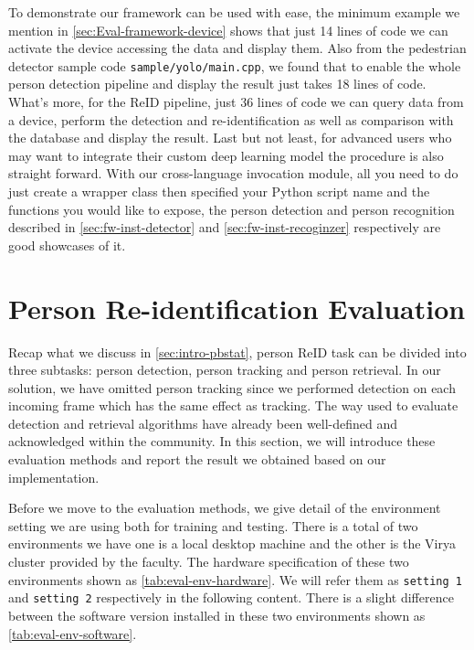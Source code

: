 To demonstrate our framework can be used with ease, the minimum example we
mention in \autoref{sec:Eval-framework-device} shows that just 14 lines of code
we can activate the device accessing the data and display them. Also from the
pedestrian detector sample code \texttt{sample/yolo/main.cpp}, we found
that to enable the whole person detection pipeline and display the result just
takes 18 lines of code. What's more, for the ReID pipeline, just 36 lines of
code we can query data from a device, perform the detection and re-identification
as well as comparison with the database and display the result. Last but not
least, for advanced users who may want to integrate their custom deep learning
model the procedure is also straight forward. With our cross-language invocation
module, all you need to do just create a wrapper class then specified your
Python script name and the functions you would like to expose, the person
detection and person recognition described in \autoref{sec:fw-inst-detector}
and \autoref{sec:fw-inst-recoginzer} respectively are good showcases of it.



\section{Person Re-identification Evaluation}
\label{sec:Eval-reid-app}

Recap what we discuss in \autoref{sec:intro-pbstat}, person ReID task can be
divided into three subtasks: person detection, person tracking and
person retrieval. In our solution, we have omitted person tracking
since we performed detection on each incoming frame which has the
same effect as tracking. The way used to evaluate detection and
retrieval algorithms have already been well-defined and acknowledged
within the community. In this section, we will introduce these
evaluation methods and report the result we obtained based on our
implementation.

Before we move to the evaluation methods, we give detail of the
environment setting we are using both for training and testing.
There is a total of two environments we have one is a local desktop machine
and the other is the Virya cluster provided by the faculty. The hardware
specification of these two environments shown as
\autoref{tab:eval-env-hardware}. We will refer them as \texttt{setting 1}
and \texttt{setting 2} respectively in the following content. There is a slight
difference between the software version installed in these two environments
shown as
\autoref{tab:eval-env-software}.

